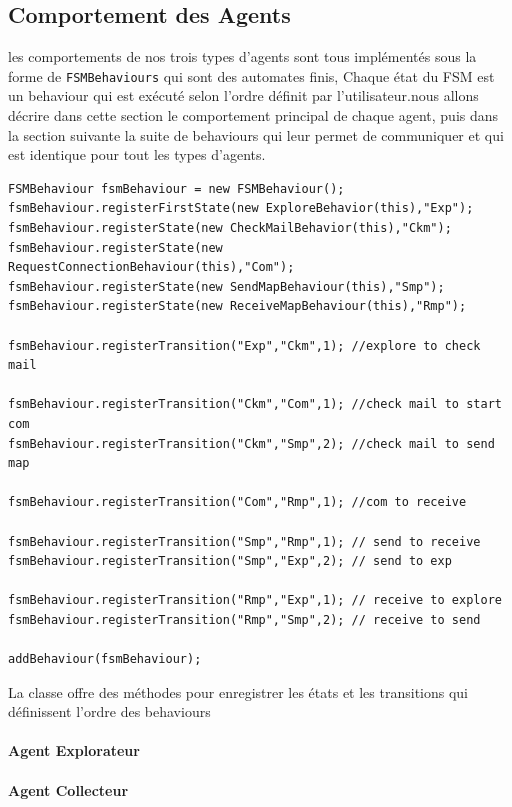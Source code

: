 \documentclass[10pt]{article}
\begin{document}
	\subsection{Comportement des Agents}
	les comportements de nos trois types d'agents sont tous implémentés sous la forme de \texttt{FSMBehaviours} qui sont des automates finis, Chaque état du FSM est un behaviour qui est exécuté selon l'ordre définit par l'utilisateur.nous allons décrire dans cette section le comportement principal de chaque agent, puis dans la section suivante la suite de behaviours qui leur permet de communiquer et qui est identique pour tout les types d'agents.  
	

\begin{lstlisting}
FSMBehaviour fsmBehaviour = new FSMBehaviour();
fsmBehaviour.registerFirstState(new ExploreBehavior(this),"Exp");
fsmBehaviour.registerState(new CheckMailBehavior(this),"Ckm");
fsmBehaviour.registerState(new RequestConnectionBehaviour(this),"Com");
fsmBehaviour.registerState(new SendMapBehaviour(this),"Smp");
fsmBehaviour.registerState(new ReceiveMapBehaviour(this),"Rmp");

fsmBehaviour.registerTransition("Exp","Ckm",1); //explore to check mail

fsmBehaviour.registerTransition("Ckm","Com",1); //check mail to start com
fsmBehaviour.registerTransition("Ckm","Smp",2); //check mail to send map

fsmBehaviour.registerTransition("Com","Rmp",1); //com to receive

fsmBehaviour.registerTransition("Smp","Rmp",1); // send to receive
fsmBehaviour.registerTransition("Smp","Exp",2); // send to exp

fsmBehaviour.registerTransition("Rmp","Exp",1); // receive to explore
fsmBehaviour.registerTransition("Rmp","Smp",2); // receive to send

addBehaviour(fsmBehaviour);
\end{lstlisting}
La classe offre des méthodes pour enregistrer les états et les transitions qui définissent l'ordre des behaviours
	
	
	
	\paragraph{Agent Explorateur}

	\paragraph{Agent Collecteur}
	
\end{document}
